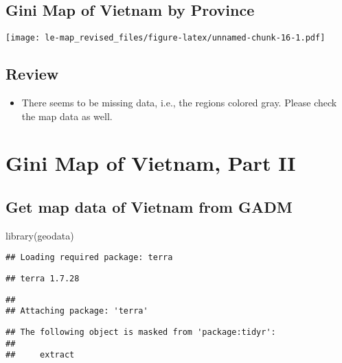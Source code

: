\documentclass[
]{article}
\newenvironment{Shaded}{\begin{snugshade}}{\end{snugshade}}
\newcommand{\FunctionTok}[1]{\textcolor[rgb]{0.00,0.00,0.00}{#1}}
\newcommand{\NormalTok}[1]{#1}
\providecommand{\tightlist}{%
  \setlength{\itemsep}{0pt}\setlength{\parskip}{0pt}}
\begin{document}
\hypertarget{gini-map-of-vietnam-by-province}{%
\subsection{Gini Map of Vietnam by
Province}\label{gini-map-of-vietnam-by-province}}

\texttt{[image: le-map\_revised\_files/figure-latex/unnamed-chunk-16-1.pdf]}

\hypertarget{review}{%
\subsection{Review}\label{review}}

\begin{itemize}
\tightlist
\item
  There seems to be missing data, i.e., the regions colored gray. Please
  check the map data as well.
\end{itemize}

\hypertarget{gini-map-of-vietnam-part-ii}{%
\section{Gini Map of Vietnam, Part
II}\label{gini-map-of-vietnam-part-ii}}

\hypertarget{get-map-data-of-vietnam-from-gadm}{%
\subsection{Get map data of Vietnam from
GADM}\label{get-map-data-of-vietnam-from-gadm}}

\begin{Shaded}
\begin{Highlighting}[]
\FunctionTok{library}\NormalTok{(geodata)}
\end{Highlighting}
\end{Shaded}

\begin{verbatim}
## Loading required package: terra
\end{verbatim}

\begin{verbatim}
## terra 1.7.28
\end{verbatim}

\begin{verbatim}
## 
## Attaching package: 'terra'
\end{verbatim}

\begin{verbatim}
## The following object is masked from 'package:tidyr':
## 
##     extract
\end{verbatim}
\end{document}
